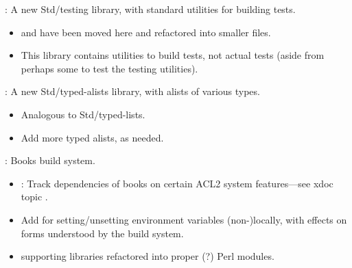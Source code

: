 
\begin{frame}

\newlibtitle

:
A new Std/testing library, with standard utilities for building tests.
\begin{itemize}
\item
{} and 
have been moved here and refactored into smaller files.
\item
This library contains utilities to build tests,
not actual tests (aside from perhaps some to test the testing utilities).
\end{itemize}

\separation

:
A new Std/typed-alists library, with alists of various types.
\begin{itemize}
\item
Analogous to Std/typed-lists.
\item
Add more typed alists, as needed.
\end{itemize}

\end{frame}


\begin{frame}

\implibtitle

:
Books build system.
\begin{itemize}
\item {}: Track dependencies of books on certain ACL2 system features---see xdoc topic .
\item Add  for setting/unsetting environment
  variables (non-)locally, with effects on  forms
  understood by the build system.
\item {} supporting libraries refactored into proper (?) Perl modules.
\end{itemize}

\end{frame}


